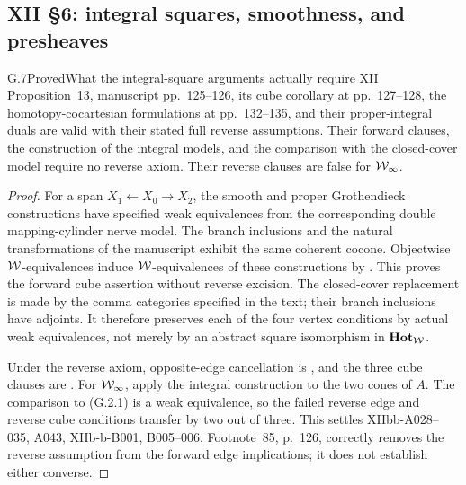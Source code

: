 \subsection{XII \S6: integral squares, smoothness, and presheaves}

\begin{claim}{G.7}{Proved}{What the integral-square arguments actually require}
XII Proposition~13, manuscript pp.~125--126, its cube corollary at pp.~127--128, the homotopy-cocartesian formulations at pp.~132--135, and their proper-integral duals are valid with their stated full reverse assumptions. Their forward clauses, the construction of the integral models, and the comparison with the closed-cover model require no reverse axiom. Their reverse clauses are false for $\mathcal{W}_{\infty}$.
\end{claim}
\begin{proof}
For a span $X_1\leftarrow X_0\to X_2$, the smooth and proper Grothendieck constructions have specified weak equivalences from the corresponding double mapping-cylinder nerve model. The branch inclusions and the natural transformations of the manuscript exhibit the same coherent cocone. Objectwise $\mathcal{W}$-equivalences induce $\mathcal{W}$-equivalences of these constructions by . This proves the forward cube assertion without reverse excision. The closed-cover replacement is made by the comma categories specified in the text; their branch inclusions have adjoints. It therefore preserves each of the four vertex conditions by actual weak equivalences, not merely by an abstract square isomorphism in $\mathbf{Hot}_{\mathcal{W}}$.

Under the reverse axiom, opposite-edge cancellation is , and the three cube clauses are . For $\mathcal{W}_{\infty}$, apply the integral construction to the two cones of $A$. The comparison to (G.2.1) is a weak equivalence, so the failed reverse edge and reverse cube conditions transfer by two out of three. This settles XIIbb-A028--035, A043, XIIb-b-B001, B005--006. Footnote~85, p.~126, correctly removes the reverse assumption from the forward edge implications; it does not establish either converse.
\end{proof}

